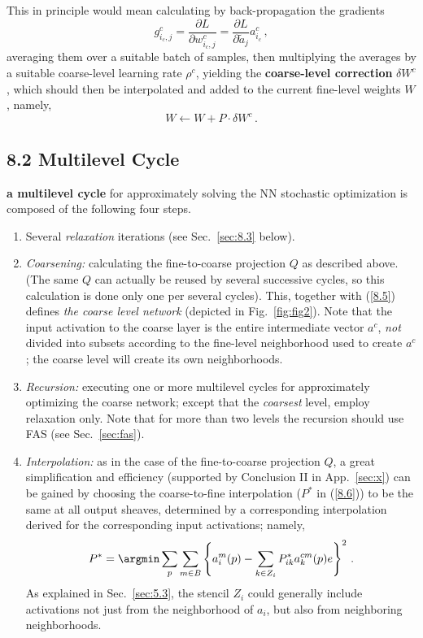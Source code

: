 \documentclass{article} %
\begin{document}
This in principle would mean calculating by back-propagation the gradients
\begin{equation}
	g^c_{i_c,j} = \frac{\partial L}{\partial w^c_{i_c,j}} =
	\frac{\partial L}{\partial \tilde{a}_j} a^c_{i_c}\,,
	\label{gc}
\end{equation}
averaging them over a suitable batch of samples, then multiplying the averages by a suitable coarse-level learning rate $\rho^c$, yielding the \textbf{coarse-level correction} $\delta W^c$, which should then be interpolated and added to the current fine-level weights $W$, namely,
\begin{equation}
	W \longleftarrow W + P \cdot \delta W^c\,.
	\label{w_correction}
\end{equation}

\subsection{8.2 Multilevel Cycle}
\label{sec:multilevel_cycle}
{\bf a multilevel cycle} for approximately solving the NN stochastic optimization is composed of the following four steps.
\begin{enumerate}
    \item Several {\it relaxation} iterations (see Sec.~\ref{sec:8.3} below).
    \item {\it Coarsening:} calculating the fine-to-coarse projection $Q$ as described above. (The same $Q$ can actually be reused by several successive cycles, so this calculation is done only one per several cycles). This, together with (\ref{8.5}) defines {\it the coarse level network} (depicted in Fig.~\ref{fig:fig2}). Note that the input activation to the coarse layer is the entire intermediate vector $a^c$, {\it not} divided into subsets according to the fine-level neighborhood used to create $a^c$; the coarse level will create its own neighborhoods.
    \item {\it Recursion:} executing one or more multilevel cycles for approximately optimizing the coarse network; except that the {\it coarsest} level, employ relaxation only. Note that for more than two levels the recursion should use FAS (see Sec.~\ref{sec:fas}).
    \item {\it Interpolation:} as in the case of the fine-to-coarse projection $Q$, a great simplification and efficiency (supported by Conclusion II in App.~\ref{sec:x}) can be gained by choosing the coarse-to-fine interpolation ($P^*$ in (\ref{8.6})) to be the same at all output sheaves, determined by a corresponding interpolation derived for the corresponding input activations; namely,
    \begin{equation}
        P^* = \argmin \sum_p \sum_{m \in B} \left\{ a^m_i(p) - \sum_{k \in Z_i} P^*_{ik} a^{cm}_k(p)e\right\}^2\,.
        \label{pstar_fit}
    \end{equation}
    As explained in Sec.~\ref{sec:5.3}, the stencil $Z_i$ could generally include activations not just from the neighborhood of $a_i$, but also from neighboring neighborhoods.
\end{enumerate}
\end{document}
